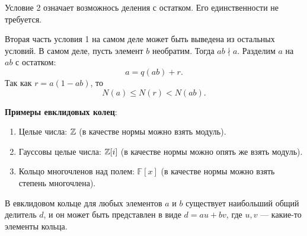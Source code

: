 \begin{remark}
    Условие 2 означает возможнось деления с остатком. Его единственности не требуется.

    Вторая часть условия 1 на самом деле может быть выведена из остальных условий. В самом деле, пусть элемент $b$ необратим. Тогда $ab \nmid a$. Разделим $a$ на $ab$ с остатком:
    $$
    a = q(ab) + r.
    $$
    Так как $r = a(1 - ab)$, то
    $$
    N(a) \leqslant N(r) < N(ab).
    $$
\end{remark}

\textbf{Примеры евклидовых колец}:
\begin{enumerate}[nolistsep]
    \item Целые числа: $\mathbb{Z}$ (в качестве нормы можно взять модуль).
    \item Гауссовы целые числа: $\mathbb{Z}[i]$ (в качестве нормы можно опять же взять модуль).
    \item Кольцо многочленов над полем: $\mathbb{F}[x]$ (в качестве нормы можно взять степень многочлена).
\end{enumerate}

\begin{theorem}
    В евклидовом кольце для любых элементов $a$ и $b$ существует наибольший общий делитель $d$, и он может быть представлен в виде $d = au + bv$, где $u, v$ --- какие-то элементы кольца.
\end{theorem}

